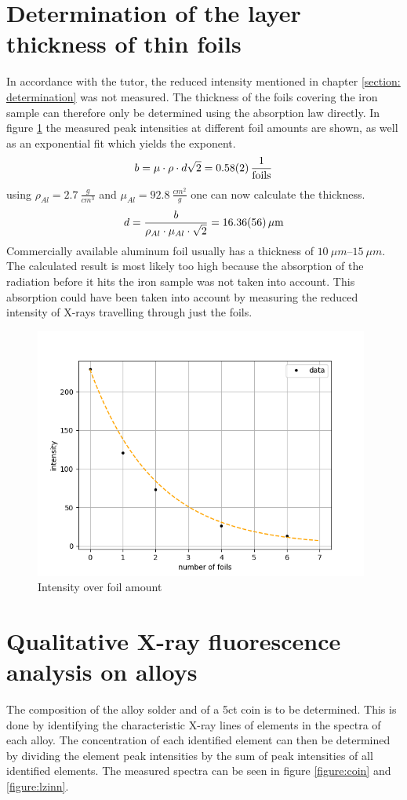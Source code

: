 \section{Determination of the layer thickness of thin foils}
In accordance with the tutor, the reduced intensity mentioned in chapter \ref{section: determination} was not measured. The thickness of the foils covering the iron sample can therefore only be determined using the absorption law directly. In figure \ref{figure:foils} the measured peak intensities at different foil amounts are shown, as well as an exponential fit which yields the exponent.
$$ b = \mu\cdot \rho \cdot d \sqrt{2} = \SI{0.58 \pm 0.02}{\frac{1}{foils}}$$
using $\rho_{Al}= \SI{2.7}{\frac{g}{cm^3}}$ and $\mu_{Al} = \SI{92.8}{\frac{cm^2}{g}}$ one can now calculate the thickness. 
$$d = \frac{b}{\rho_{Al} \cdot \mu_{Al} \cdot \sqrt{2}} = \SI{16.36 \pm 0.56}{\mu m}$$
Commercially available aluminum foil usually has a thickness of $\SIrange[]{10}{15}{\mu m}$. The calculated result is most likely too high because the absorption of the radiation before it hits the iron sample was not taken into account. This absorption could have been taken into account by measuring the reduced intensity of X-rays travelling through just the foils. 

\begin{figure}[H]
   
    \centering
    \includegraphics[width=110mm,scale=0.5]{MAX/include/foils.png}
    \caption{Intensity over foil amount}
    \label{figure:foils}
\end{figure}


\section{Qualitative X-ray fluorescence analysis on alloys}
The composition of the alloy solder and of a 5ct coin is to be determined. This is done by identifying the characteristic X-ray lines of elements in the spectra of each alloy. The concentration of each identified element can then be determined by dividing the element peak intensities by the sum of peak intensities of all identified elements. The measured spectra can be seen in figure \ref{figure:coin} and \ref{figure:lzinn}. \\

